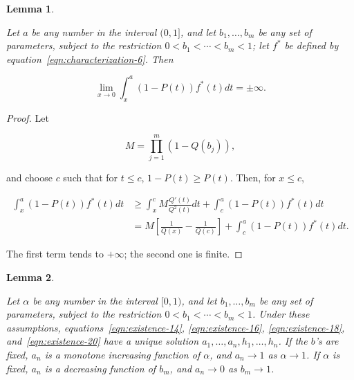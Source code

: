 \documentclass{article}
\newtheorem{lemma}{Lemma}
\begin{document}
\begin{lemma} \label{lemma:infinite-limit}

Let $a$ be any number in the interval $(0, 1]$, and let $b_1, \dots, b_m$ be
any set of parameters, subject to the restriction $0 < b_1 < \cdots < b_m < 1$;
let $f^*$ be defined by equation~\ref{eqn:characterization-6}. Then

\[
\lim_{x \to 0} \int_{x}^a (1-P(t)) f^*(t) dt = \pm \infty.
\]

\end{lemma}

\begin{proof}

Let

\[
M = \prod_{j=1}^m (1 - Q(b_j)),
\]

and choose $c$ such that for $t \leq c$, $1 - P(t) \geq P(t)$. Then, for $x
\leq c$,

\[
\begin{aligned}
\int_{x}^a (1 - P(t)) f^*(t) dt &\geq \int_{x}^c M\frac{Q'(t)}{Q^2(t)} dt
+ \int_{c}^a (1-P(t)) f^*(t) dt \\
&= M \left [ \frac{1}{Q(x)} - \frac{1}{Q(c)} \right ]
+ \int_{c}^a (1-P(t)) f^*(t) dt.
\end{aligned}
\]

The first term tends to $+ \infty$; the second one is finite.

\end{proof}

\begin{lemma} \label{lemma:unique-inc-dec}

Let $\alpha$ be any number in the interval $[0,1)$, and let $b_1, \dots, b_m$
be any set of parameters, subject to the restriction $0 < b_1 < \cdots < b_m <
1$. Under these assumptions, equations~\ref{eqn:existence-14},
\ref{eqn:existence-16}, \ref{eqn:existence-18}, and~\ref{eqn:existence-20} have
a unique solution $a_1, \dots, a_n, h_1, \dots, h_n$. If the $b$'s are fixed,
$a_n$ is a monotone increasing function of $\alpha$, and $a_n \to 1$ as $\alpha
\to 1$. If $\alpha$ is fixed, $a_n$ is a decreasing function of $b_m$, and $a_n
\to 0$ as $b_m \to 1$.

\end{lemma}
\end{document}
